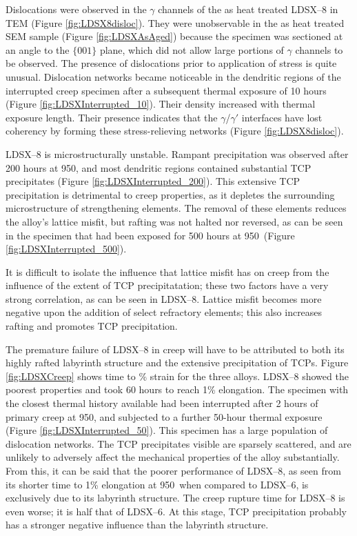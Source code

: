 Dislocations were observed in the $\gamma$ channels of the as heat treated LDSX--8 in TEM (Figure \ref{fig:LDSX8disloc}).  They were unobservable in the as heat treated SEM sample (Figure \ref{fig:LDSXAsAged}) because the specimen was sectioned at an angle to the $\{001\}$ plane, which did not allow large portions of $\gamma$ channels to be observed.  The presence of dislocations prior to application of stress is quite unusual.  Dislocation networks became noticeable in the dendritic regions of the interrupted creep specimen after a subsequent thermal exposure of 10 hours (Figure \ref{fig:LDSXInterrupted_10}).  Their density increased with thermal exposure length.  Their presence indicates that the $\gamma$/$\gamma'$ interfaces have lost coherency by forming these stress-relieving networks (Figure \ref{fig:LDSX8disloc}).  

LDSX--8 is microstructurally unstable.  Rampant precipitation was observed after 200 hours at 950\celsius, and most dendritic regions contained substantial TCP precipitates (Figure \ref{fig:LDSXInterrupted_200}).  This extensive TCP precipitation is detrimental to creep properties, as it depletes the surrounding microstructure of strengthening elements.  The removal of these elements reduces the alloy's lattice misfit, but rafting was not halted nor reversed, as can be seen in the specimen that had been exposed for 500 hours at 950\celsius\ (Figure \ref{fig:LDSXInterrupted_500}). 

It is difficult to isolate the influence that lattice misfit has on creep from the influence of the extent of TCP precipitatation; these two factors have a very strong correlation, as can be seen in LDSX--8.  Lattice misfit becomes more negative upon the addition of select refractory elements; this also increases rafting and promotes TCP precipitation. 

The premature failure of LDSX--8 in creep will have to be attributed to both its highly rafted labyrinth structure and the extensive precipitation of TCPs.  Figure \ref{fig:LDSXCreep} shows time to \% strain for the three alloys.  LDSX--8 showed the poorest properties and took 60 hours to reach 1\% elongation.  The specimen with the closest thermal history available had been interrupted after 2 hours of primary creep at 950\celsius, and subjected to a further 50-hour thermal exposure (Figure \ref{fig:LDSXInterrupted_50}).  This specimen has a large population of dislocation networks.  The TCP precipitates visible are sparsely scattered, and are unlikely to adversely affect the mechanical properties of the alloy substantially.  From this, it can be said that the poorer performance of LDSX--8, as seen from its shorter time to 1\% elongation at 950\celsius\ when compared to LDSX--6, is exclusively due to its labyrinth structure.  The creep rupture time for LDSX--8 is even worse; it is half that of LDSX--6.  At this stage, TCP precipitation probably has a stronger negative influence than the labyrinth structure.

